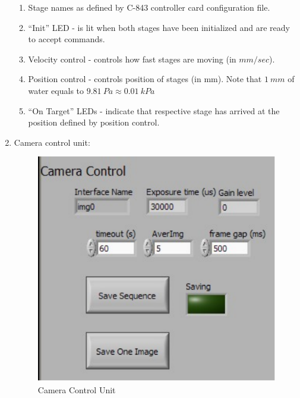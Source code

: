 \documentclass[a4paper,12pt]{article}
\begin{document}
\begin{enumerate}
	\begin{enumerate}
		\item Stage names as defined by C-843 controller card configuration file.
		\item ``Init'' LED - is lit when both stages have been initialized and are ready to accept commands.
		\item Velocity control - controls how fast stages are moving (in $mm/sec$).
		\item Position control - controls position of stages (in mm). Note that $1~mm$ of water equals to $9.81~Pa \approx 0.01~kPa$
		\item ``On Target'' LEDs - indicate that respective stage has arrived at the position defined by position control.
	\end{enumerate}
	
	\item Camera control unit:
	
	\begin{figure}
		\centering
			\includegraphics{figs/labvamp_cam.pdf}
		\caption{Camera Control Unit}
		\label{fig:labvamp_cam}
	\end{figure}


\end{enumerate}
\end{document}
